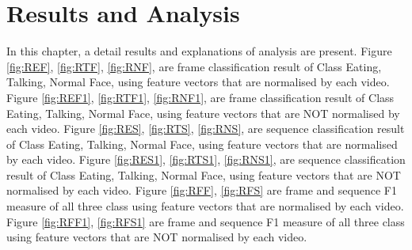 \section{Results and Analysis}
In this chapter, a detail results and explanations of analysis are present. Figure \ref{fig:REF}, \ref{fig:RTF}, \ref{fig:RNF}, are frame classification result of Class Eating, Talking, Normal Face, using feature vectors that are normalised by each video. Figure \ref{fig:REF1}, \ref{fig:RTF1}, \ref{fig:RNF1}, are frame classification result of Class Eating, Talking, Normal Face, using feature vectors that are NOT normalised by each video. Figure \ref{fig:RES}, \ref{fig:RTS}, \ref{fig:RNS}, are sequence classification result of Class Eating, Talking, Normal Face, using feature vectors that are normalised by each video. Figure \ref{fig:RES1}, \ref{fig:RTS1}, \ref{fig:RNS1}, are sequence classification result of Class Eating, Talking, Normal Face, using feature vectors that are NOT normalised by each video. Figure \ref{fig:RFF}, \ref{fig:RFS} are frame and sequence F1 measure of all three class using feature vectors that are normalised by each video. Figure \ref{fig:RFF1}, \ref{fig:RFS1} are frame and sequence F1 measure of all three class using feature vectors that are NOT normalised by each video.

